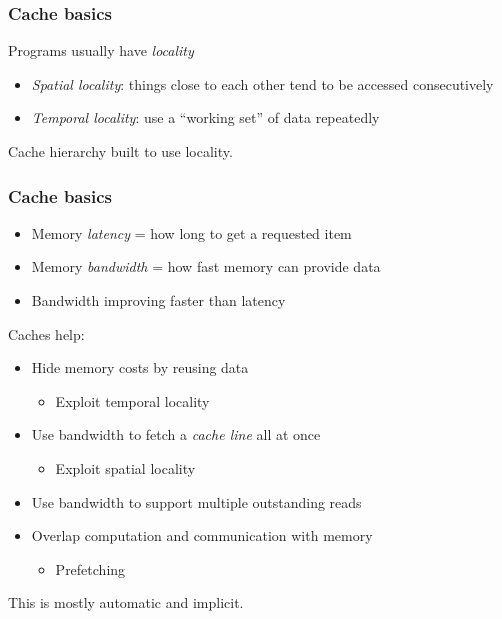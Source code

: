 \documentclass{beamer}
\begin{document}
\begin{frame}
  \frametitle{Cache basics}
  
  Programs usually have {\em locality}
  \begin{itemize}
  \item {\em Spatial locality}: things close to each other tend to be
    accessed consecutively
  \item {\em Temporal locality}: use a ``working set'' of data repeatedly
  \end{itemize}
  Cache hierarchy built to use locality.

\end{frame}


\begin{frame}
  \frametitle{Cache basics}

  \begin{itemize}
  \item Memory {\em latency} = how long to get a requested item
  \item Memory {\em bandwidth} = how fast memory can provide data
  \item Bandwidth improving faster than latency
  \end{itemize}

  Caches help:
  \begin{itemize}
  \item Hide memory costs by reusing data
    \begin{itemize}
    \item Exploit temporal locality
    \end{itemize}
  \item Use bandwidth to fetch a {\em cache line} all at once
    \begin{itemize}
    \item Exploit spatial locality
    \end{itemize}
  \item Use bandwidth to support multiple outstanding reads
  \item Overlap computation and communication with memory
    \begin{itemize}
    \item Prefetching
    \end{itemize}
  \end{itemize}

  This is mostly automatic and implicit.

\end{frame}
\end{document}
